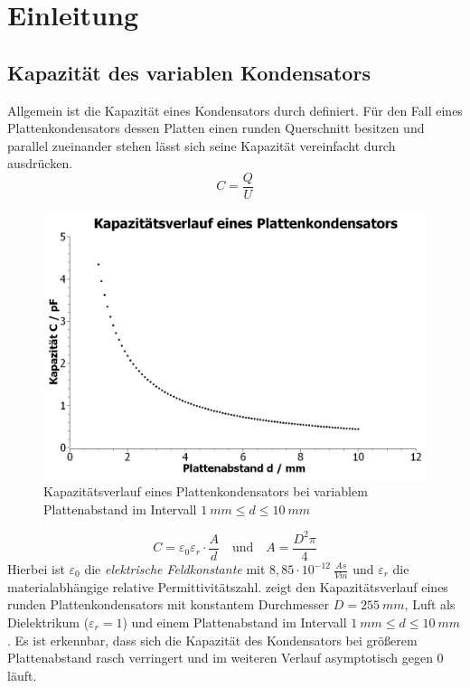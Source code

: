 \chapter{Einleitung}
\section{Kapazität des variablen Kondensators}
Allgemein ist die Kapazität eines Kondensators durch  definiert. Für den Fall eines Plattenkondensators dessen
Platten einen runden Querschnitt besitzen und parallel zueinander stehen lässt sich seine Kapazität vereinfacht durch
 ausdrücken.
\begin{equation}
    C = \frac{Q}{U}
    \label{eq:cap}
\end{equation}
%
\begin{figure}[h]
    \centering
    \includegraphics[width=.8\textwidth]{scidavis/kapazitaetsverlauf.jpeg}
    \caption[Kapazitätsverlauf eines Plattenkondensators]{Kapazitätsverlauf eines Plattenkondensators bei variablem Plattenabstand im Intervall \(\SI{1}{mm} \leq d \leq \SI{10}{mm}\)}
    \label{fig:kapVerlauf}
\end{figure}
%
\begin{equation}
    C = \varepsilon_0\varepsilon_r \cdot \frac{A}{d} \quad \text{und} \quad A = \frac{D^2 \pi}{4}
    \label{eq:plattencap}
\end{equation}
Hierbei ist \(\varepsilon_0\) die \textit{elektrische Feldkonstante} mit \(8,85 \cdot 10^{-12}\SI{}{\tfrac{As}{Vm}}\) \cite{Haberle.2007}
und \(\varepsilon_r\) die materialabhängige relative Permittivitätszahl.  zeigt den Kapazitätsverlauf
eines runden Plattenkondensators mit konstantem Durchmesser \(D = \SI{255}{mm}\), Luft als Dielektrikum (\(\varepsilon_r = 1\))
und einem Plattenabstand im Intervall \(\SI{1}{mm} \leq d \leq \SI{10}{mm}\). Es ist erkennbar, dass sich die Kapazität des Kondensators
bei größerem Plattenabstand rasch verringert und im weiteren Verlauf asymptotisch gegen \(0\) läuft.
%
%
